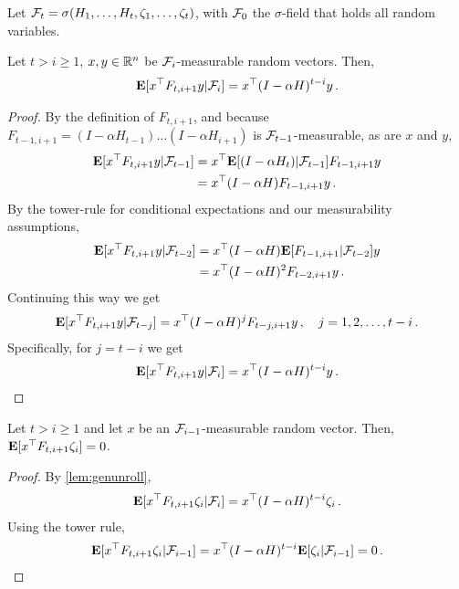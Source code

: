 Let $\mathcal{F}_t = \sigma( H_1,\dots,H_t, \zeta_1,\dots,\zeta_t ) $, with $\mathcal{F}_0$ the $\sigma$-field that holds all random variables.
\newcommand{\cF}{\F}
\begin{lemma}\label{lem:genunroll}
Let $t>i\ge 1$, $x,y\in \mathbb{R}^n$ be $\mathcal{F}_{i}$-measurable random vectors. Then,
\begin{align*}
\mathbf{E}[x^\top F_{t,i+1}y|\mathcal{F}_i]=x^\top (I-\alpha H)^{t-i} y\,.
\end{align*}
\end{lemma}
\begin{proof}
By the definition of $F_{t,i+1}$,
and because $F_{t-1,i+1} = (I-\alpha H_{t-1}) \dots (I-\alpha H_{i+1})$ is $\cF_{t-1}$-measurable,
as are $x$ and $y$,
\begin{align*}
\EE{x^\top F_{t,i+1} y | \cF_{t-1} } &= x^\top \EE{ (I-\alpha H_t) | \cF_{t-1} } F_{t-1,i+1} y\\
&=x^\top  (I-\alpha H)  F_{t-1,i+1} y\,.
\end{align*}
By the tower-rule for conditional expectations and our measurability assumptions,
\begin{align*}
\EE{x^\top F_{t,i+1} y | \cF_{t-2} }
&=x^\top  (I-\alpha H)  \EE{F_{t-1,i+1} |\cF_{t-2}} y\\
&= x^\top (I-\alpha H)^2 F_{t-2,i+1} y\,.
\end{align*}
Continuing this way we get
\begin{align*}
\EE{x^\top F_{t,i+1} y | \cF_{t-j} }
= x^\top (I-\alpha H)^j F_{t-j,i+1} y\,, \quad j=1,2,\dots,t-i\,.
\end{align*}
Specifically, for $j=t-i$ we get
\begin{align*}
\EE{x^\top F_{t,i+1} y | \cF_{i} }  = x^\top (I-\alpha H)^{t-i} y\,.
\end{align*}
\end{proof}

\begin{lemma}\label{noisecancel}
Let $t>i\ge 1$ and let $x$ be an $\mathcal{F}_{i-1}$-measurable random vector. Then,
$\mathbf{E}[x^\top F_{t,i+1}\zeta_{i}]=0$.
\end{lemma}
\begin{proof}
By \cref{lem:genunroll},
\begin{align*}
\EE{x^\top F_{t,i+1} \zeta_i | \cF_{i} }  = x^\top (I-\alpha H)^{t-i} \zeta_i\,.
\end{align*}
Using the tower rule,
\begin{align*}
\EE{x^\top F_{t,i+1} \zeta_i | \cF_{i-1} }
= x^\top (I-\alpha H)^{t-i}\EE{ \zeta_i | \cF_{i-1} }= 0\,.
\end{align*}
\end{proof}

